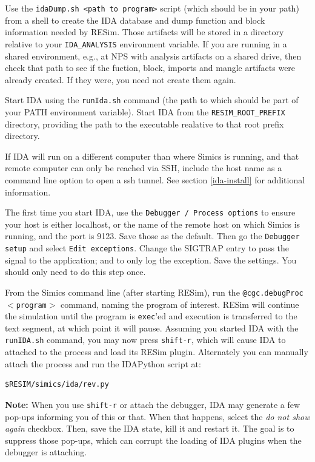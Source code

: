\documentclass[titlepage]{article}
\begin{document}
Use the {\tt idaDump.sh <path to program>} script (which should be in your path) from a shell to create the IDA database and dump function and block information
needed by RESim.  Those artifacts will be stored in a directory relative to your {\tt IDA\_ANALYSIS} environment variable.
If you are running in a shared environment, e.g., at NPS with analysis artifacts on a shared drive, then 
check that path to see if the fuction, block, imports and mangle artifacts were already created.  If they were, you need not create them again.

Start IDA using the {\tt runIda.sh} command (the path to which should be part of your PATH environment variable).  Start IDA from the
{\tt RESIM\_ROOT\_PREFIX} directory, providing the path to the executable realative to that root prefix directory.

If IDA will run on a different computer than where Simics is running, and that remote computer can only be reached via SSH, include the host 
name as a command line option to open a ssh tunnel.  See section \ref{ida-install} for additional information.

The first time you start IDA, use the {\tt Debugger / Process options} to ensure your host is either localhost, or the name of the remote host
on which Simics is running, and the port is 9123.  Save those as 
the default.  Then go the {\tt Debugger setup} and select {\tt Edit exceptions}.  Change the SIGTRAP entry to pass the signal to the application;
and to only log the exception.  Save the settings.  You should only need to do this step once.

From the Simics command line (after starting RESim), run the {\tt @cgc.debugProc$<$program$>$} command, naming the program of interest.
RESim will continue the simulation until the program is {\tt exec}'ed and execution is transferred to the text segment, at which point it will pause.
Assuming you started IDA with the {\tt runIDA.sh} command, you may now press {\tt shift-r}, which will cause IDA to attached to the
process and load its RESim plugin.  Alternately you can manually attach the process and run the IDAPython script at:
\begin{verbatim}
$RESIM/simics/ida/rev.py
\end{verbatim}

\noindent \textbf{Note:} When you use {\tt shift-r} or attach the debugger, IDA may generate a few pop-ups informing you of this or that.  When that happens, select the 
\textit{do not show again} checkbox.  Then, save the IDA state, kill it and restart it.  The goal is to suppress those pop-ups, which can corrupt the
loading of IDA plugins when the debugger is attaching.
\end{document}
